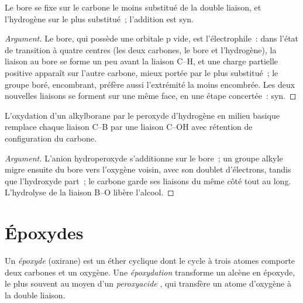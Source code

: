 \begin{proposition}\label{prop:b2:alkene-redox:hydroboration-regio}
Le bore se fixe sur le carbone le moins substitué de la double liaison, et l'hydrogène sur le
plus substitué~; l'addition est syn.
\end{proposition}

\begin{proof}[Argument]
Le bore, qui possède une orbitale p vide, est l'électrophile~: dans l'état de transition à quatre
centres (les deux carbones, le bore et l'hydrogène), la liaison au bore se forme un peu avant la
liaison C--H, et une charge partielle positive apparaît sur l'autre carbone, mieux portée par le
plus substitué~; le groupe boré, encombrant, préfère aussi l'extrémité la moins encombrée. Les
deux nouvelles liaisons se forment sur une même face, en une étape concertée~: syn.
\end{proof}

\begin{proposition}\label{prop:b2:alkene-redox:retention}
L'oxydation d'un alkylborane par le peroxyde d'hydrogène en milieu basique remplace chaque
liaison C--B par une liaison C--OH avec rétention de configuration du carbone.
\end{proposition}

\begin{proof}[Argument]
L'anion hydroperoxyde s'additionne sur le bore~; un groupe alkyle migre ensuite du bore vers
l'oxygène voisin, avec son doublet d'électrons, tandis que l'hydroxyde part~; le carbone garde
ses liaisons du même côté tout au long. L'hydrolyse de la liaison B--O libère l'alcool.
\end{proof}

\section{Époxydes}

\begin{definition}[Époxyde]\label{def:b2:alkene-redox:epoxide}
Un \emph{époxyde} (oxirane) est un éther cyclique dont le cycle à trois atomes
comporte deux carbones et un oxygène. Une \emph{époxydation} transforme
un alcène en époxyde, le plus souvent au moyen d'un \emph{peroxyacide} , qui
transfère un atome d'oxygène à la double liaison.
\end{definition}

